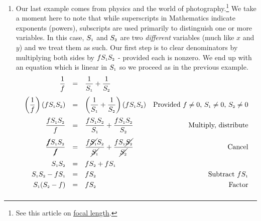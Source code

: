 \begin{ex}
\begin{enumerate}
\item  Our last example comes from physics and the world of photography.\footnote{See this article on \href{https://en.wikipedia.org/wiki/Focal_length}{\underline{focal length}}.}  We take a moment here to note that while superscripts in Mathematics indicate exponents (powers), subscripts are used primarily to distinguish one or more variables.  In this case, $S_{\text{\tiny $1$}}$ and $S_{\text{\tiny $2$}}$ are two \textit{different} variables (much like $x$ and $y$) and we treat them as such. Our first step is to clear denominators by multiplying both sides by $f S_{\text{\tiny $1$}} S_{\text{\tiny $2$}}$ - provided each is nonzero.  We end up with an equation which is linear in $S_{\text{\tiny $1$}}$ so we proceed as in the previous example.  \[ \begin{array}{rclr}

\dfrac{1}{f} & = & \dfrac{1}{S_{\text{\tiny $1$}}} + \dfrac{1}{S_{\text{\tiny $2$}}} & \\ [12pt]


\left(\dfrac{1}{f}\right)(fS_{\text{\tiny $1$}}S_{\text{\tiny $2$}}) & = & \left(\dfrac{1}{S_{\text{\tiny $1$}}} + \dfrac{1}{S_{\text{\tiny $2$}}}\right) (fS_{\text{\tiny $1$}}S_{\text{\tiny $2$}}) & \text{Provided $f \neq 0$, $S_{\text{\tiny $1$}} \neq 0$, $S_{\text{\tiny $2$}}\neq 0$} \\ [12pt]

\dfrac{fS_{\text{\tiny $1$}}S_{\text{\tiny $2$}}}{f} & = & \dfrac{fS_{\text{\tiny $1$}}S_{\text{\tiny $2$}}}{S_{\text{\tiny $1$}}} + \dfrac{fS_{\text{\tiny $1$}}S_{\text{\tiny $2$}}}{S_{\text{\tiny $2$}}} & \text{Multiply, distribute} \\ [12pt]


\dfrac{\cancel{f}S_{\text{\tiny $1$}}S_{\text{\tiny $2$}}}{\cancel{f}} & = & \dfrac{f\cancel{S_{\text{\tiny $1$}}}S_{\text{\tiny $2$}}}{\cancel{S_{\text{\tiny $1$}}}} + \dfrac{fS_{\text{\tiny $1$}}\cancel{S_{\text{\tiny $2$}}}}{\cancel{S_{\text{\tiny $2$}}}} & \text{Cancel} \\ [12pt]

S_{\text{\tiny $1$}}S_{\text{\tiny $2$}} & = & f S_{\text{\tiny $2$}} + fS_{\text{\tiny $1$}} & \\ [3pt]

S_{\text{\tiny $1$}}S_{\text{\tiny $2$}}  - fS_{\text{\tiny $1$}} & = & f S_{\text{\tiny $2$}}   &  \text{Subtract $fS_{\text{\tiny $1$}}$} \\ [3pt]

S_{\text{\tiny $1$}}(S_{\text{\tiny $2$}} - f) & = & f S_{\text{\tiny $2$}} & \text{Factor}  \\ [5pt]


\end{array}\]
\end{enumerate}
\end{ex}
